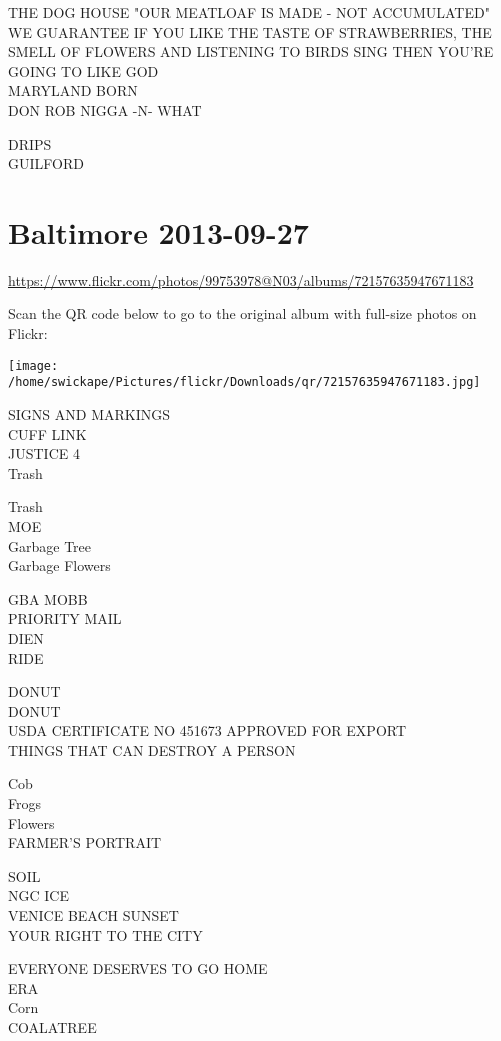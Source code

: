 \documentclass[10pt,letterpaper]{article}
\begin{document}
THE DOG HOUSE "OUR MEATLOAF IS MADE {-} NOT ACCUMULATED"\\
WE GUARANTEE IF YOU LIKE THE TASTE OF STRAWBERRIES, THE SMELL OF FLOWERS AND LISTENING TO BIRDS SING THEN YOU'RE GOING TO LIKE GOD\\
MARYLAND BORN\\
DON ROB NIGGA {-}N{-} WHAT

DRIPS\\
GUILFORD


\section*{Baltimore 2013-09-27}

\url{https://www.flickr.com/photos/99753978@N03/albums/72157635947671183}

Scan the QR code below to go to the original album with full-size photos on Flickr:

\texttt{[image: /home/swickape/Pictures/flickr/Downloads/qr/72157635947671183.jpg]}


SIGNS AND MARKINGS\\
CUFF LINK\\
JUSTICE 4\\
Trash

Trash\\
MOE\\
Garbage Tree\\
Garbage Flowers

GBA MOBB\\
PRIORITY MAIL\\
DIEN\\
RIDE

DONUT\\
DONUT\\
USDA CERTIFICATE NO 451673 APPROVED FOR EXPORT\\
THINGS THAT CAN DESTROY A PERSON

Cob\\
Frogs\\
Flowers\\
FARMER'S PORTRAIT

SOIL\\
NGC ICE\\
VENICE BEACH SUNSET\\
YOUR RIGHT TO THE CITY

EVERYONE DESERVES TO GO HOME\\
ERA\\
Corn\\
COALATREE
\end{document}
